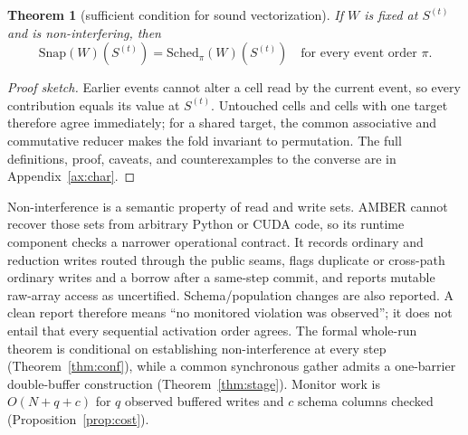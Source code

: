 \documentclass[sigconf,nonacm,review,natbib=true]{acmart}
\newtheorem{theorem}{Theorem}
\theoremstyle{definition}
\theoremstyle{plain}
\theoremstyle{remark}
\begin{document}
\begin{theorem}[sufficient condition for sound vectorization]\label{thm:char}
If $W$ is fixed at $S^{(t)}$ and is non-interfering, then
\[
\mathrm{Snap}(W)(S^{(t)})=\mathrm{Sched}_{\pi}(W)(S^{(t)})
\quad\text{for every event order }\pi.
\]
\end{theorem}

\begin{proof}[Proof sketch]
Earlier events cannot alter a cell read by the current event, so every
contribution equals its value at $S^{(t)}$. Untouched cells and cells with one
target therefore agree immediately; for a shared target, the
common associative and commutative reducer makes the fold invariant to
permutation. The full definitions, proof, caveats, and counterexamples to the
converse are in Appendix~\ref{ax:char}.
\end{proof}

Non-interference is a semantic property of read and write sets. AMBER cannot
recover those sets from arbitrary Python or CUDA code, so its runtime component
checks a narrower operational contract. It records ordinary and reduction
writes routed through the public seams, flags duplicate or cross-path ordinary
writes and a borrow after a same-step commit, and reports mutable raw-array
access as uncertified. Schema/population changes are also reported. A clean
report therefore means ``no monitored violation was observed''; it does
not entail that every sequential activation order agrees. The formal whole-run
theorem is conditional on establishing non-interference at every step
(Theorem~\ref{thm:conf}), while a common synchronous gather admits a
one-barrier double-buffer construction (Theorem~\ref{thm:stage}). Monitor work is
$O(N+q+c)$ for $q$ observed buffered writes and $c$ schema columns checked
(Proposition~\ref{prop:cost}).
\end{document}
